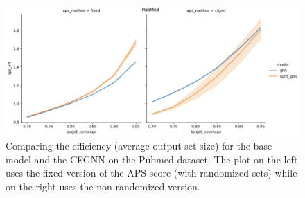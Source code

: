 \begin{figure}
    \centering
    \includegraphics[width=0.8\linewidth]{graphConformal/figures/PubMed_CF.png}
    \caption{Comparing the efficiency (average output set size) for the base model and the CFGNN on the Pubmed dataset. The plot on the left uses the fixed version of the APS score (with randomized sets) while on the right uses the non-randomized version.}
    \label{fig:CFGNN:preliminary}
\end{figure}
